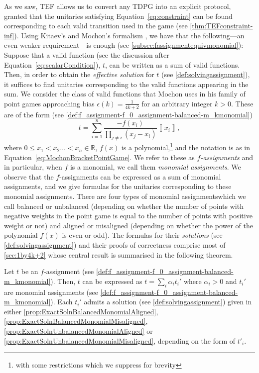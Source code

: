 \documentclass{theoretics}
\begin{document}
As we saw, TEF allows us to convert any TDPG into an explicit protocol, granted that
the unitaries satisfying Equation~\eqref{eq:constraint} can be found corresponding
to each valid transition
used in the game (see \cref{thm:TEFconstraint-inf}). Using Kitaev's and Mochon's
formalism \cite{Mochon07}, we have that the following---an even weaker
requirement---is enough (see \cref{subsec:fassignmentequivmonomial}): Suppose that a valid function (see the discussion after Equation~\eqref{eq:scalarCondition}), $t$, can be written
as a sum of valid functions. Then, in order to obtain the \emph{effective solution} for $t$ (see \cref{def:solvingassignment}), it suffices to find unitaries corresponding
to the valid functions appearing in the sum.
We consider the class of valid functions that Mochon uses in his family
of point games approaching bias $\epsilon(k)=\frac{1}{4k+2}$ for an arbitrary integer $k>0$.
These are of the form (see \cref{def:f_assignment-f_0_assignment-balanced-m_kmonomial})
\begin{displaymath}
  t=\sum_{i=1}^{n}\frac{-f(x_{i})}{\prod_{j\neq i}(x_{j}-x_{i})}\left\llbracket x_{i}\right\rrbracket,
\end{displaymath}
where $0\le x_{1}<x_{2}\dots<x_{n}\in \mathbb{R}$, $f(x)$ is a polynomial,\footnote{with some restrictions which we suppress for brevity} and the notation is as in Equation~\eqref{eq:MochonBracketPointGame}.
We refer to these as \emph{$f$-assignments} and in particular, when
$f$ is a monomial, we call them \emph{monomial assignments}. We observe that the $f$-assignments
can be expressed as a sum of monomial assignments, and we give formulas for the unitaries corresponding to these monomial assignments. There
are four types of monomial assignments\textemdash which we call balanced or unbalanced (depending on whether the number of points with negative weights in the point game is equal to the number of points with positive weight or not) and
aligned or misaligned (depending on whether the power of the polynomial $f(x)$ is even or odd). The formulas for their \emph{solutions} (see \cref{def:solvingassignment}) and their
proofs of correctness comprise most of \cref{sec:1by4k+2} whose central result is summarised in the following theorem.
\begin{theorem}
  Let $t$ be an $f$-assignment (see \cref{def:f_assignment-f_0_assignment-balanced-m_kmonomial}).
  Then, $t$ can be expressed as $t=\sum_{i}\alpha_{i}t_{i}'$ where
  $\alpha_{i}>0$ and $t_{i}'$ are monomial assignments (see \cref{def:f_assignment-f_0_assignment-balanced-m_kmonomial}).
  Each $t_{i}'$ admits a solution (see \cref{def:solvingassignment}) given in either  \cref{prop:ExactSolnBalancedMonomialAligned},
  \cref{prop:ExactSolnBalancedMonomialMisaligned}, \cref{prop:ExactSolnUnbalancedMonomialAligned}
  or \cref{prop:ExactSolnUnbalancedMonomialMisaligned}, depending on
  the form of $t'_{i}$. \label{thm:Main}
\end{theorem}
\end{document}
